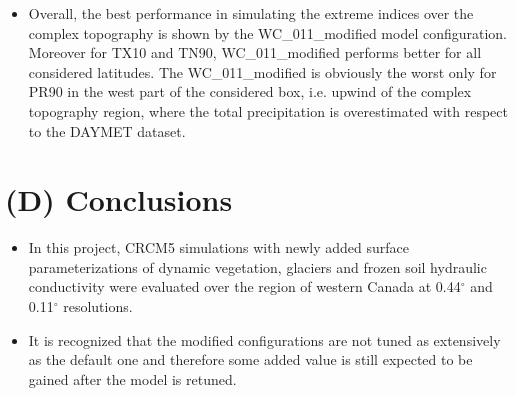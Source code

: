 \documentclass[a0b,landscape]{a0poster}
\begin{document}
\begin{multicols*}{4}
\vspace{0.25cm}
\noindent
\begin{minipage}[t]{\linewidth}
  \begin{itemize}
      \item Overall, the best performance in simulating the extreme indices over the complex
            topography is shown by the WC\_011\_modified model configuration. Moreover for TX10 and TN90, WC\_011\_modified performs better
            for all considered latitudes. The WC\_011\_modified is obviously the worst only for PR90 in the west part of the considered box,
            i.e. upwind of the complex topography region, where the total precipitation is overestimated with respect to the DAYMET dataset.
  \end{itemize}
\end{minipage}



{
  \color{SaddleBrown} %

  \section*{(D) Conclusions}

  \begin{itemize}
  \item In this project, CRCM5 simulations with newly added surface parameterizations of dynamic vegetation,
  glaciers and frozen soil hydraulic conductivity were evaluated over the region of western Canada at 0.44$^\circ$ and 0.11$^\circ$ resolutions.
  \item It is recognized that the modified configurations are not tuned as extensively as the default one and therefore
  some added value is still expected to be gained after the model is retuned.
  \end{itemize}
}


\end{multicols*}
\end{document}
